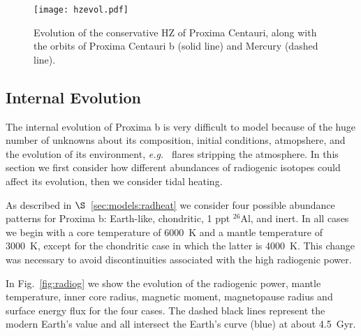 \documentclass[preprint,12pt]{aastex}
\def\eg{{\it e.g.\ }}
\begin{document}
\begin{figure}[ht]
\centering
\texttt{[image: hzevol.pdf]}
\caption{Evolution of the conservative HZ of Proxima Centauri, along with the orbits of Proxima Centauri b (solid line) and Mercury (dashed line).}
\label{fig:HZEvol}
\end{figure}

\subsection{Internal Evolution}
\label{sec:results:internal}


The internal evolution of Proxima b is very difficult to model because
of the huge number of unknowns about its composition, initial
conditions, atmopshere, and the evolution of its environment, \eg
flares stripping the atmosphere. In this section we first consider how
different abundances of radiogenic isotopes could affect its
evolution, then we consider tidal heating.




As described in $\S$~\ref{sec:models:radheat} we consider four
possible abundance patterns for Proxima b: Earth-like, chondritic, 1
ppt $^{26}$Al, and inert. In all cases we begin with a core
temperature of 6000~K and a mantle temperature of 3000~K, except for
the chondritic case in which the latter is 4000~K. This change
was necessary to avoid discontinuities associated with the high
radiogenic power.

In Fig.~\ref{fig:radiog} we show the evolution of the radiogenic
power, mantle temperature, inner core radius, magnetic moment,
magnetopause radius and surface energy flux for the four cases. The
dashed black lines represent the modern Earth's value and all
intersect the Earth's curve (blue) at about 4.5~Gyr.
\end{document}
